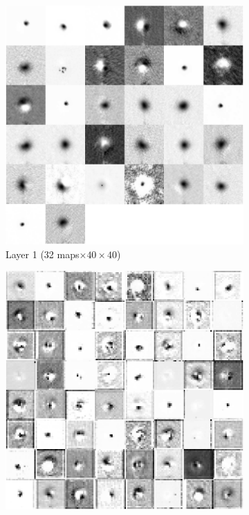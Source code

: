 \documentclass[fleqn,usenatbib]{mnras}
\begin{document}
\begin{figure}
\begin{subfigure}[c]{0.24\linewidth}
    \includegraphics[width=\textwidth]{figures/star_conv11.pdf}
    \caption{Layer 1 (32 maps$\times40\times40$)}
  \end{subfigure}
  \hfill
  \begin{subfigure}[c]{0.24\linewidth}
  \centering
    \includegraphics[width=\textwidth]{figures/star_conv21.pdf}

\end{subfigure}
\end{figure}
\end{document}
